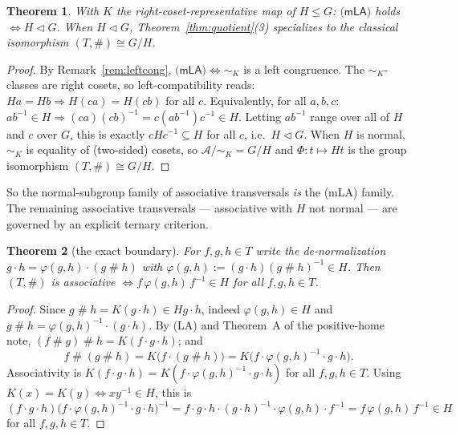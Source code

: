 \documentclass[11pt]{amsart}
\theoremstyle{plain}
\newtheorem{theorem}{Theorem}[section]
\theoremstyle{definition}
\theoremstyle{remark}
\renewcommand{\lhd}{\triangleleft}
\newcommand{\sh}{\mathbin{\#}}
\newcommand{\LA}{\textsf{(LA)}}
\newcommand{\mLA}{\textsf{(mLA)}}
\newcommand{\simK}{\mathrel{\sim_{K}}}
\begin{document}
\begin{theorem}
\label{thm:normal}
With $K$ the right-coset-representative map of $H\le G$: $\mLA{}$ holds $\Leftrightarrow H\lhd G$.
When $H\lhd G$, Theorem~\ref{thm:quotient}(3) specializes to the classical isomorphism
$(T,\sh)\cong G/H$.
\end{theorem}

\begin{proof}
By Remark~\ref{rem:leftcong}, $\mLA{}\Leftrightarrow\simK$ is a left congruence. The $\simK$-classes
are right cosets, so left-compatibility reads: $Ha=Hb\Rightarrow H(ca)=H(cb)$ for all $c$.
Equivalently, for all $a,b,c$: $ab^{-1}\in H\Rightarrow(ca)(cb)^{-1}=c(ab^{-1})c^{-1}\in H$. Letting
$ab^{-1}$ range over all of $H$ and $c$ over $G$, this is exactly $cHc^{-1}\subseteq H$ for all $c$,
i.e.\ $H\lhd G$. When $H$ is normal, $\simK$ is equality of (two-sided) cosets, so
$\mathcal{A}/\!\simK=G/H$ and $\Phi\colon t\mapsto Ht$ is the group isomorphism $(T,\sh)\cong G/H$.
\end{proof}

So the normal-subgroup family of associative transversals \emph{is} the \mLA{} family. The remaining
associative transversals --- associative with $H$ not normal --- are governed by an explicit ternary
criterion.

\begin{theorem}[the exact boundary]
\label{thm:criterion}
For $f,g,h\in T$ write the de-normalization $g\cdot h=\varphi(g,h)\cdot(g\sh h)$ with
$\varphi(g,h):=(g\cdot h)(g\sh h)^{-1}\in H$. Then $(T,\sh)$ is associative $\Leftrightarrow
f\,\varphi(g,h)\,f^{-1}\in H$ for all $f,g,h\in T$.
\end{theorem}

\begin{proof}
Since $g\sh h=K(g\cdot h)\in Hg\cdot h$, indeed $\varphi(g,h)\in H$ and
$g\sh h=\varphi(g,h)^{-1}\cdot(g\cdot h)$. By \LA{} and Theorem~A of the positive-home note,
$(f\sh g)\sh h=K(f\cdot g\cdot h)$; and
\[
  f\sh(g\sh h)=K\big(f\cdot(g\sh h)\big)=K\big(f\cdot\varphi(g,h)^{-1}\cdot g\cdot h\big).
\]
Associativity is $K(f\cdot g\cdot h)=K(f\cdot\varphi(g,h)^{-1}\cdot g\cdot h)$ for all $f,g,h\in T$.
Using $K(x)=K(y)\Leftrightarrow xy^{-1}\in H$, this is
\[
  (f\cdot g\cdot h)\big(f\cdot\varphi(g,h)^{-1}\cdot g\cdot h\big)^{-1}
   = f\cdot g\cdot h\cdot(g\cdot h)^{-1}\cdot\varphi(g,h)\cdot f^{-1}
   = f\,\varphi(g,h)\,f^{-1}\in H
\]
for all $f,g,h\in T$.
\end{proof}
\end{document}
